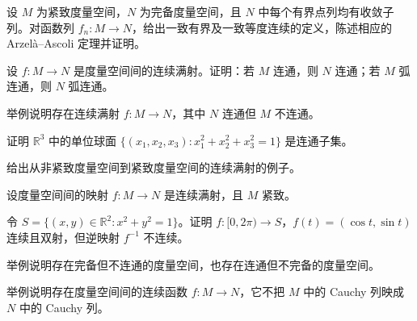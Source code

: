 \noindent\begin{minipage}{\textwidth}
设 $M$ 为紧致度量空间，$N$ 为完备度量空间，且 $N$ 中每个有界点列均有收敛子列。对函数列 $f_n:M\to N$，给出一致有界及一致等度连续的定义，陈述相应的 Arzel\`a--Ascoli 定理并证明。
\end{minipage}\par\vfill
\noindent\begin{minipage}{\textwidth}
设 $f:M\to N$ 是度量空间间的连续满射。证明：若 $M$ 连通，则 $N$ 连通；若 $M$ 弧连通，则 $N$ 弧连通。
\end{minipage}\par\vfill
\newpage
\noindent\begin{minipage}{\textwidth}
举例说明存在连续满射 $f:M\to N$，其中 $N$ 连通但 $M$ 不连通。
\end{minipage}\par\vfill
\noindent\begin{minipage}{\textwidth}
证明 $\mathbb R^3$ 中的单位球面 $\{(x_1,x_2,x_3):x_1^2+x_2^2+x_3^2=1\}$ 是连通子集。
\end{minipage}\par\vfill
\noindent\begin{minipage}{\textwidth}
给出从非紧致度量空间到紧致度量空间的连续满射的例子。
\end{minipage}\par\vfill
\noindent\begin{minipage}{\textwidth}
设度量空间间的映射 $f:M\to N$ 是连续满射，且 $M$ 紧致。
\end{minipage}\par\vfill
\newpage
\noindent\begin{minipage}{\textwidth}
令 $S=\{(x,y)\in\mathbb R^2:x^2+y^2=1\}$。证明 $f:[0,2\pi)\to S$，$f(t)=(\cos t,\sin t)$ 连续且双射，但逆映射 $f^{-1}$ 不连续。
\end{minipage}\par\vfill
\noindent\begin{minipage}{\textwidth}
举例说明存在完备但不连通的度量空间，也存在连通但不完备的度量空间。
\end{minipage}\par\vfill
\noindent\begin{minipage}{\textwidth}
举例说明存在度量空间间的连续函数 $f:M\to N$，它不把 $M$ 中的 Cauchy 列映成 $N$ 中的 Cauchy 列。
\end{minipage}\par\vfill
